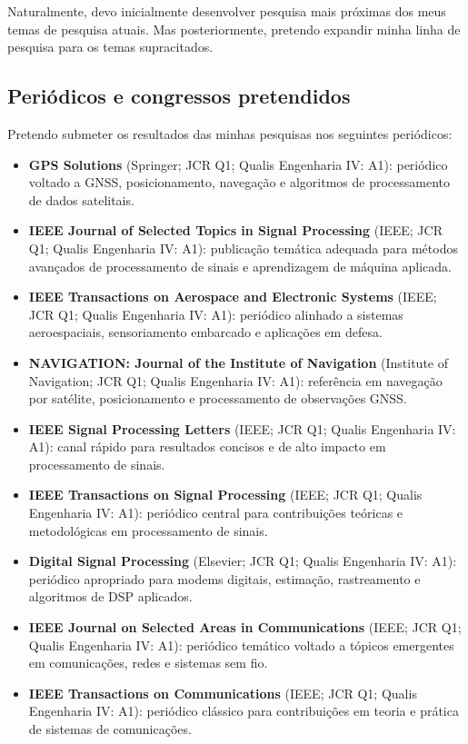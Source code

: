 \documentclass{article}
\begin{document}
Naturalmente, devo inicialmente desenvolver pesquisa mais próximas dos meus temas de pesquisa atuais. Mas posteriormente, pretendo expandir minha linha de pesquisa para os temas supracitados.

\subsection{Periódicos e congressos pretendidos}

Pretendo submeter os resultados das minhas pesquisas nos seguintes periódicos:
\begin{itemize}
  \item \textbf{GPS Solutions} (Springer; JCR Q1; Qualis Engenharia IV: A1): periódico voltado a GNSS, posicionamento, navegação e algoritmos de processamento de dados satelitais.
  \item \textbf{IEEE Journal of Selected Topics in Signal Processing} (IEEE; JCR Q1; Qualis Engenharia IV: A1): publicação temática adequada para métodos avançados de processamento de sinais e aprendizagem de máquina aplicada.
  \item \textbf{IEEE Transactions on Aerospace and Electronic Systems} (IEEE; JCR Q1; Qualis Engenharia IV: A1): periódico alinhado a sistemas aeroespaciais, sensoriamento embarcado e aplicações em defesa.
  \item \textbf{NAVIGATION: Journal of the Institute of Navigation} (Institute of Navigation; JCR Q1; Qualis Engenharia IV: A1): referência em navegação por satélite, posicionamento e processamento de observações GNSS.
  \item \textbf{IEEE Signal Processing Letters} (IEEE; JCR Q1; Qualis Engenharia IV: A1): canal rápido para resultados concisos e de alto impacto em processamento de sinais.
  \item \textbf{IEEE Transactions on Signal Processing} (IEEE; JCR Q1; Qualis Engenharia IV: A1): periódico central para contribuições teóricas e metodológicas em processamento de sinais.
  \item \textbf{Digital Signal Processing} (Elsevier; JCR Q1; Qualis Engenharia IV: A1): periódico apropriado para modems digitais, estimação, rastreamento e algoritmos de DSP aplicados.
  \item \textbf{IEEE Journal on Selected Areas in Communications} (IEEE; JCR Q1; Qualis Engenharia IV: A1): periódico temático voltado a tópicos emergentes em comunicações, redes e sistemas sem fio.
  \item \textbf{IEEE Transactions on Communications} (IEEE; JCR Q1; Qualis Engenharia IV: A1): periódico clássico para contribuições em teoria e prática de sistemas de comunicações.

\end{itemize}
\end{document}
